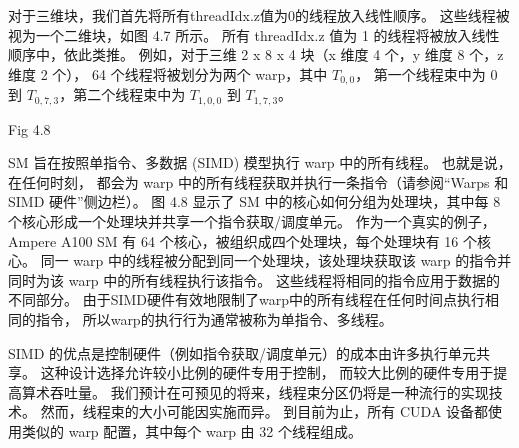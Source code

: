 对于三维块，我们首先将所有threadIdx.z值为0的线程放入线性顺序。 这些线程被视为一个二维块，如图 4.7 所示。 
所有 threadIdx.z 值为 1 的线程将被放入线性顺序中，依此类推。 
例如，对于三维 2 x 8 x 4 块（x 维度 4 个，y 维度 8 个，z 维度 2 个），
64 个线程将被划分为两个 warp，其中 $T_{0,0}$， 
第一个线程束中为 0 到 $T_{0,7,3}$，第二个线程束中为 $T_{1,0,0}$ 到 $T_{1,7,3}$。

{\color{red} Fig 4.8}

SM 旨在按照单指令、多数据 (SIMD) 模型执行 warp 中的所有线程。 也就是说，在任何时刻，
都会为 warp 中的所有线程获取并执行一条指令（请参阅“Warps 和 SIMD 硬件”侧边栏）。 
图 4.8 显示了 SM 中的核心如何分组为处理块，其中每 8 个核心形成一个处理块并共享一个指令获取/调度单元。 
作为一个真实的例子，Ampere A100 SM 有 64 个核心，被组织成四个处理块，每个处理块有 16 个核心。 
同一 warp 中的线程被分配到同一个处理块，该处理块获取该 warp 的指令并同时为该 warp 中的所有线程执行该指令。 
这些线程将相同的指令应用于数据的不同部分。 由于SIMD硬件有效地限制了warp中的所有线程在任何时间点执行相同的指令，
所以warp的执行行为通常被称为单指令、多线程。

SIMD 的优点是控制硬件（例如指令获取/调度单元）的成本由许多执行单元共享。 这种设计选择允许较小比例的硬件专用于控制，
而较大比例的硬件专用于提高算术吞吐量。 我们预计在可预见的将来，线程束分区仍将是一种流行的实现技术。 
然而，线程束的大小可能因实施而异。 到目前为止，所有 CUDA 设备都使用类似的 warp 配置，其中每个 warp 由 32 个线程组成。

